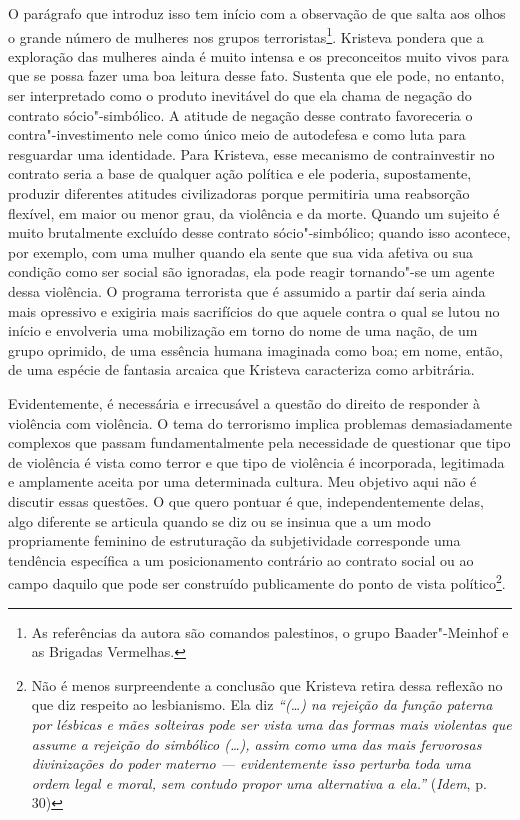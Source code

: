 O parágrafo que introduz isso tem início com a observação de que salta
aos olhos o grande número de mulheres nos grupos terroristas\footnote{As
  referências da autora são comandos palestinos, o grupo Baader"-Meinhof
  e as Brigadas Vermelhas.}. Kristeva pondera que a exploração das
mulheres ainda é muito intensa e os preconceitos muito vivos para que se
possa fazer uma boa leitura desse fato. Sustenta que ele pode, no
entanto, ser interpretado como o produto inevitável do que ela chama de
negação do contrato sócio"-simbólico. A atitude de negação desse contrato
favoreceria o contra"-investimento nele como único meio de autodefesa e
como luta para resguardar uma identidade. Para Kristeva, esse mecanismo
de contrainvestir no contrato seria a base de qualquer ação política e
ele poderia, supostamente, produzir diferentes atitudes civilizadoras
porque permitiria uma reabsorção flexível, em maior ou menor grau, da
violência e da morte. Quando um sujeito é muito brutalmente excluído
desse contrato sócio"-simbólico; quando isso acontece, por exemplo, com
uma mulher quando ela sente que sua vida afetiva ou sua condição como
ser social são ignoradas, ela pode reagir tornando"-se um agente dessa
violência. O programa terrorista que é assumido a partir daí seria ainda
mais opressivo e exigiria mais sacrifícios do que aquele contra o qual
se lutou no início e envolveria uma mobilização em torno do nome de uma
nação, de um grupo oprimido, de uma essência humana imaginada como boa;
em nome, então, de uma espécie de fantasia arcaica que Kristeva
caracteriza como arbitrária.

Evidentemente, é necessária e irrecusável a questão do direito de
responder à violência com violência. O tema do terrorismo implica
problemas demasiadamente complexos que passam fundamentalmente pela
necessidade de questionar que tipo de violência é vista como terror e
que tipo de violência é incorporada, legitimada e amplamente aceita por
uma determinada cultura. Meu objetivo aqui não é discutir essas
questões. O que quero pontuar é que, independentemente delas, algo
diferente se articula quando se diz ou se insinua que a um modo
propriamente feminino de estruturação da subjetividade corresponde uma
tendência específica a um posicionamento contrário ao contrato social ou
ao campo daquilo que pode ser construído publicamente do ponto de vista
político\footnote{Não é menos surpreendente a conclusão que Kristeva
  retira dessa reflexão no que diz respeito ao lesbianismo. Ela diz
  \emph{``(\ldots{}) na rejeição da função paterna por lésbicas e mães
      solteiras pode ser vista uma das formas mais violentas que assume a
      rejeição do simbólico (\ldots{}), assim como uma das mais fervorosas
      divinizações do poder materno --- evidentemente isso perturba toda uma
      ordem legal e moral, sem contudo propor uma alternativa a ela.''}
  (\emph{Idem}, p. 30)}.

